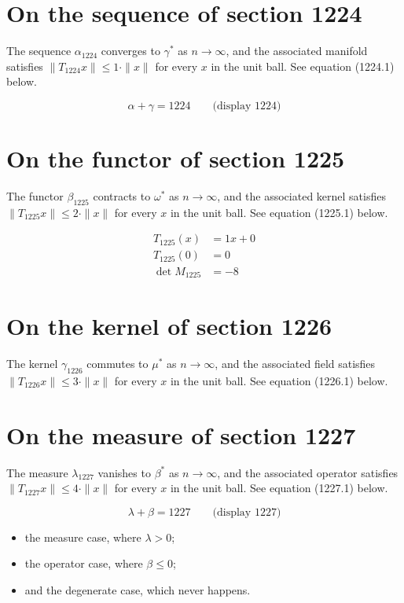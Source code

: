 \documentclass{article}
\begin{document}
\section{On the sequence of section 1224}
The sequence $\alpha_{1224}$ converges to $\gamma^{*}$ as $n \to \infty$,
and the associated manifold satisfies $\|T_{1224} x\| \leq 1 \cdot \|x\|$
for every $x$ in the unit ball. See equation (1224.1) below.

$$
\alpha + \gamma = 1224 \qquad \text{(display 1224)}
$$

\section{On the functor of section 1225}
The functor $\beta_{1225}$ contracts to $\omega^{*}$ as $n \to \infty$,
and the associated kernel satisfies $\|T_{1225} x\| \leq 2 \cdot \|x\|$
for every $x$ in the unit ball. See equation (1225.1) below.

\begin{align}
T_{1225}(x) &= 1 x + 0 \\
T_{1225}(0) &= 0 \\
\det M_{1225} &= -8
\end{align}

\section{On the kernel of section 1226}
The kernel $\gamma_{1226}$ commutes to $\mu^{*}$ as $n \to \infty$,
and the associated field satisfies $\|T_{1226} x\| \leq 3 \cdot \|x\|$
for every $x$ in the unit ball. See equation (1226.1) below.

\section{On the measure of section 1227}
The measure $\lambda_{1227}$ vanishes to $\beta^{*}$ as $n \to \infty$,
and the associated operator satisfies $\|T_{1227} x\| \leq 4 \cdot \|x\|$
for every $x$ in the unit ball. See equation (1227.1) below.

$$
\lambda + \beta = 1227 \qquad \text{(display 1227)}
$$

\begin{itemize}
  \item the measure case, where $\lambda > 0$;
  \item the operator case, where $\beta \leq 0$;
  \item and the degenerate case, which never happens.
\end{itemize}
\end{document}
